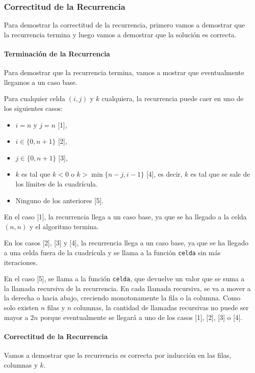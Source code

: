 \subsubsection{Correctitud de la Recurrencia}

Para demostrar la correctitud de la recurrencia, primero vamos a demostrar que la recurrencia termina y luego vamos a demostrar que la solución es correcta.

\paragraph{Terminación de la Recurrencia}

Para demostrar que la recurrencia termina, vamos a mostrar que eventualmente llegamos a un caso base.

Para cualquier celda $(i, j)$ y $k$ cualquiera, la recurrencia puede caer en uno de los siguientes casos:
\begin{itemize}
    \item $i = n$ y $j = n$ [1],
    \item $i \in \{0, n+1\}$ [2],
    \item $j \in \{0, n+1\}$ [3],
    \item $k$ es tal que $k < 0$ o $k > \min\{n - j, i - 1\}$ [4], es decir, $k$ es tal que se sale de los límites de la cuadrícula.
    \item Ninguno de los anteriores [5].
\end{itemize}

En el caso [1], la recurrencia llega a un caso base, ya que se ha llegado a la celda $(n, n)$ y el algoritmo termina.

En los casos [2], [3] y [4], la recurrencia llega a un caso base, ya que se ha llegado a una celda fuera de la cuadrícula y se llama a la función \texttt{celda} sin más iteraciones.

En el caso [5], se llama a la función \texttt{celda}, que devuelve un valor que se suma a la llamada recursiva de la recurrencia. En cada llamada recursiva, se va a mover a la derecha o hacia abajo, creciendo monotonamente la fila o la columna. Como solo existen $n$ filas y $n$ columnas, la cantidad de llamadas recursivas no puede ser mayor a $2n$ porque eventualmente se llegará a uno de los casos [1], [2], [3] o [4].

\paragraph{Correctitud de la Recurrencia}
Vamos a demostrar que la recurrencia es correcta por inducción en las filas, columnas y $k$.

